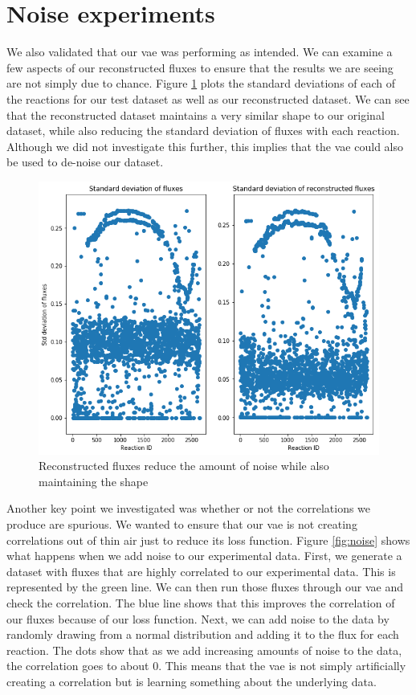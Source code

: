 \section{Noise experiments}
We also validated that our \gls{vae} was performing as intended.
We can examine a few aspects of our reconstructed fluxes to ensure that the results we are seeing are not simply due to chance.
Figure \ref{fig:recon_stds} plots the standard deviations of each of the reactions for our test dataset as well as our reconstructed dataset.
We can see that the reconstructed dataset maintains a very similar shape to our original dataset, while also reducing the standard deviation of fluxes with each reaction.
Although we did not investigate this further, this implies that the \gls{vae} could also be used to de-noise our dataset.

\begin{figure}[t!]
\begin{center}
\includegraphics[width=1.01\textwidth]{figs/Reconstructed_stds.png}
\caption[Reconstructing fluxes reduces the amount of noise]{Reconstructed fluxes reduce the amount of noise while also maintaining the shape}
\label{fig:recon_stds}
\end{center}
\end{figure}

Another key point we investigated was whether or not the correlations we produce are spurious.
We wanted to ensure that our \gls{vae} is not creating correlations out of thin air just to reduce its loss function.
Figure \ref{fig:noise} shows what happens when we add noise to our experimental data.
First, we generate a dataset with fluxes that are highly correlated to our experimental data.
This is represented by the green line. 
We can then run those fluxes through our \gls{vae} and check the correlation.
The blue line shows that this improves the correlation of our fluxes because of our loss function.
Next, we can add noise to the data by randomly drawing from a normal distribution and adding it to the flux for each reaction.
The dots show that as we add increasing amounts of noise to the data, the correlation goes to about 0.
This means that the \gls{vae} is not simply artificially creating a correlation but is learning something about the underlying data.

